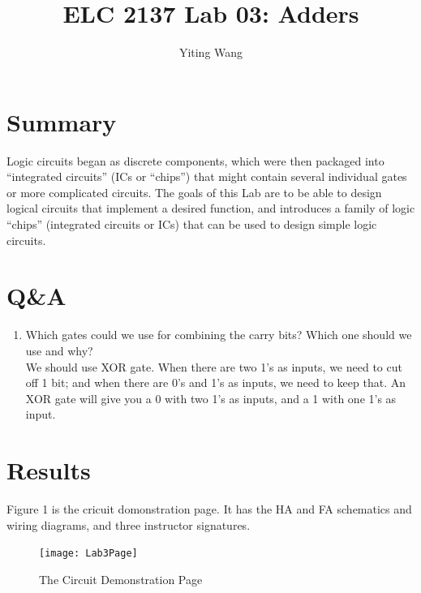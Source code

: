 \documentclass[11pt]{article}
\begin{document}
	
	\title{ELC 2137 Lab 03: Adders}
	\author{Yiting Wang}
	
	\maketitle
	
	
	\section*{Summary}
	
		Logic circuits began as discrete components, which were then packaged into “integrated circuits” (ICs or “chips”) that might contain several individual gates or more complicated circuits. The goals of this Lab are to be able to design logical circuits that implement a desired function, and introduces a family of logic “chips” (integrated circuits or ICs) that can be used to design simple logic circuits.\\
	
	
	
	\section*{Q\&A}
	
	\begin{enumerate}
		\item Which gates could we use for combining the carry bits? Which one should we use and why?\\
			We should use XOR gate. When there are two 1’s as inputs, we need to cut off 1 bit; and when there are 0's and 1’s as inputs, we need to keep that. An XOR gate will give you a 0 with two 1’s as inputs, and a 1 with one 1's as input.\\
	\end{enumerate}
	
	
	
	\section*{Results}	
	
	Figure 1 is the cricuit domonstration page. It has the HA and FA schematics and wiring diagrams, and three instructor signatures.\\
	\begin{figure}[ht]\centering
		\texttt{[image: Lab3Page]}
		\caption{The Circuit Demonstration Page}
		\label{fig:Lab3Page}
	\end{figure}
	
\end{document}
